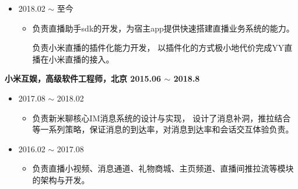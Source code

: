 \documentclass[line,margin,UTF8]{res}
\begin{document}
\begin{resume}
  \begin{itemize}
 \item {} 2018.02 $\sim$ 至今
 	\vspace{-3pt}
 	\begin{itemize}
 		\item 
 		负责直播助手sdk的开发，为宿主app提供快速搭建直播业务系统的能力。

 		负责小米直播的插件化能力开发，
 		以插件化的方式极小地代价完成YY直播在小米直播的接入。
 \end{itemize}
 \end{itemize}


{\bf 小米互娱，高级软件工程师，北京 \hfill  2015.06 $\sim$ 2018.8}
 \vspace{0pt}

 \begin{itemize}
 \item {} 2017.08 $\sim$ 2018.02
 	\vspace{-3pt}
 	\begin{itemize}
 		\item 
 		负责新米聊核心IM消息系统的设计与实现，
 		设计了消息补洞，推拉结合等一系列策略，保证消息的到达率，对消息到达率和会话交互体验负责。

 \end{itemize}
 \end{itemize}

 \begin{itemize}
 \item {} 2016.02 $\sim$ 2017.08
 	\vspace{-3pt}
 	\begin{itemize}
 		\item 
 		负责直播小视频、消息通道、礼物商城、主页频道、直播间推拉流等模块的架构与开发。
 		



\end{itemize}
\end{itemize}
\end{resume}
\end{document}
